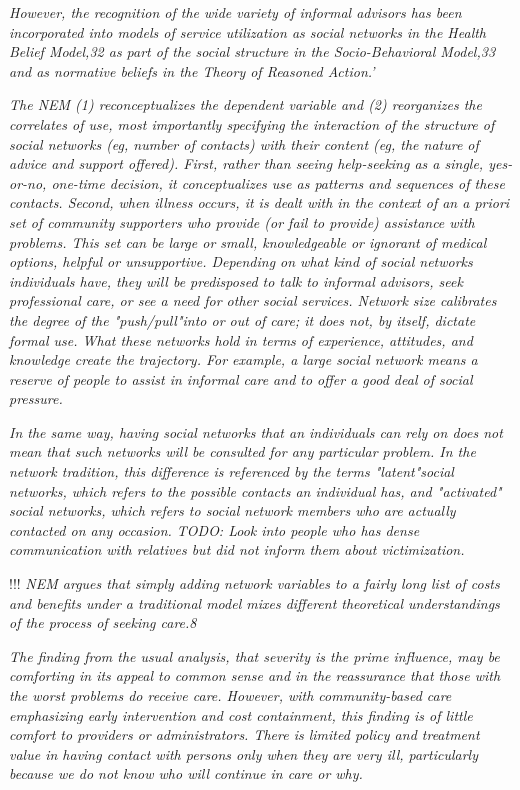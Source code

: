 \documentclass[]{article}
\begin{document}
\textit{However, the recognition of the wide variety of informal advisors has been incorporated into models of service utilization as social networks in the Health Belief Model,32 as part of the social structure in the Socio-Behavioral Model,33 and as normative beliefs in the Theory of Reasoned Action.'}

\textit{The NEM (1) reconceptualizes the dependent variable and (2) reorganizes the correlates of use, most importantly specifying the interaction of the structure of social networks (eg, number of contacts) with their content (eg, the nature of advice  and support offered). First, rather than seeing help-seeking as a single, yes-or-no, one-time decision, it conceptualizes use as patterns and sequences of these contacts. Second, when illness occurs, it is dealt with in the context of an a priori set of community supporters who provide (or fail to provide) assistance with problems. This set can be large or small, knowledgeable or ignorant of medical options, helpful or unsupportive. Depending on what kind of social networks individuals have, they will be predisposed to talk to informal advisors, seek professional care, or see a need for other social services. Network size calibrates the degree of the "push/pull"into or out of care; it does not, by itself, dictate formal use. What these networks hold in terms of experience, attitudes, and knowledge create the trajectory. For example, a large social network means a reserve of people to assist in informal care and to offer a good deal of social pressure.}

\textit{In the same way, having social networks that an individuals can rely on does not mean that such networks will be consulted for any particular problem. In the network tradition, this difference is referenced by the terms "latent"social networks, which refers to the possible contacts an individual has, and "activated" social networks, which refers to social network members who are actually contacted on any occasion. TODO: Look into people who has dense communication with relatives but did not inform them about victimization.}

!!! \textit{NEM argues that simply adding network variables to a fairly long list of costs and benefits under a traditional model mixes different theoretical understandings of the process of seeking care.8}

\textit{The finding from the usual analysis, that severity is the prime influence, may be comforting in its appeal to common sense and in the reassurance that those with the worst problems do receive care. However, with community-based care emphasizing early intervention and cost containment, this finding is of little comfort to providers or administrators. There is limited policy and treatment value in having contact with persons only when they are very ill, particularly because we do not know who will continue in care or why.}
\end{document}
